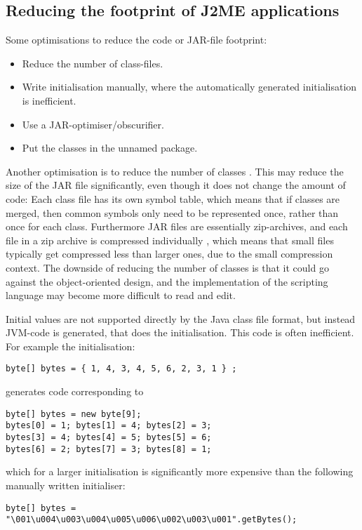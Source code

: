 \documentclass[11pt]{report}
\begin{document}
\subsection{Reducing the footprint of J2ME applications}
Some optimisations to reduce the code or JAR-file footprint:
\begin{itemize}
\item Reduce the number of class-files.
\item Write initialisation manually, where the automatically generated initialisation is inefficient.
\item Use a JAR-optimiser/obscurifier.
\item Put the classes in the unnamed package.
\end{itemize}

Another optimisation is to reduce the number of classes \cite{nokia-optim, kahlua-thesis}.
This may reduce the size of the JAR file significantly,
even though it does not change the amount of code:
Each class file has its own symbol table, which means that if classes are merged, then common symbols only need to be represented once, rather than once for each class.
Furthermore JAR files are essentially zip-archives, and each file in a zip archive is compressed individually \cite{zipspec}, which means that small files typically get compressed less than larger ones, due to the small compression context.
The downside of reducing the number of classes is that it could go against the object-oriented design, and the implementation of the scripting language may become more difficult to read and edit. 

Initial values are not supported directly by the Java class file format, but instead
JVM-code is generated, that does the initialisation. 
This code is often inefficient. For example the initialisation:
\begin{verbatim}
byte[] bytes = { 1, 4, 3, 4, 5, 6, 2, 3, 1 } ;
\end{verbatim}
generates code corresponding to
\begin{verbatim}
byte[] bytes = new byte[9];
bytes[0] = 1; bytes[1] = 4; bytes[2] = 3;
bytes[3] = 4; bytes[4] = 5; bytes[5] = 6;
bytes[6] = 2; bytes[7] = 3; bytes[8] = 1;
\end{verbatim}
which for a larger initialisation is significantly more expensive than the following manually written initialiser:
\begin{verbatim}
byte[] bytes = "\001\u004\u003\u004\u005\u006\u002\u003\u001".getBytes();
\end{verbatim}
\end{document}
